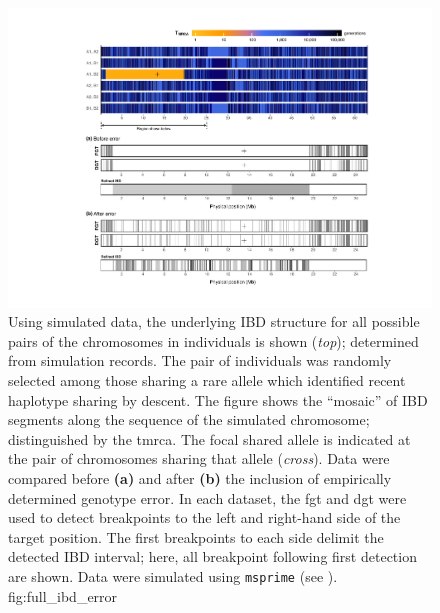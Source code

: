 

\begin{figure}[!htb]
\includegraphics[width=\textwidth]{./img/ch4/full_ibd_error_new}
{Using simulated data, the underlying IBD structure for all  possible pairs of the  chromosomes in  individuals is shown (\emph{top}); determined from simulation records.
The pair of individuals was randomly selected among those sharing a rare allele which identified recent haplotype sharing by descent.
The figure shows the ``mosaic'' of IBD segments along the sequence of the simulated chromosome; distinguished by the \gls{tmrca}.
The focal shared allele is indicated at the pair of chromosomes sharing that allele (\emph{cross}).
Data were compared before \textbf{(a)} and after \textbf{(b)} the inclusion of empirically determined genotype error.
In each dataset, the \gls{fgt} and \gls{dgt} were used to detect breakpoints to the left and right-hand side of the target position.
The first breakpoints to each side delimit the detected IBD interval; here, all breakpoint following first detection are shown.
Data were simulated using \texttt{msprime} (see ).}
{fig:full_ibd_error}
\end{figure}
